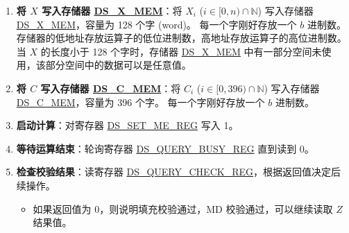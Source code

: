 \documentclass[main\_\_CN.tex]{subfiles}
\begin{document}
\begin{enumerate}
    \item {\bfseries 将 \begin{math}X\end{math} 写入存储器 \hyperref[DSXMEM]{DS\_X\_MEM}}：将 \begin{math}X_{i}\end{math}
        (\begin{math}i \in [0,n) \cap \mathbb{N}\end{math})
        写入存储器 \hyperref[DSXMEM]{DS\_X\_MEM}，容量为 128 个字 (word)。
        每一个字刚好存放一个 \begin{math}b\end{math} 进制数。存储器的低地址存放运算子的低位进制数，高地址存放运算子的高位进制数。当 \begin{math}X\end{math} 的长度小于 128 个字时，存储器 \hyperref[DSXMEM]{DS\_X\_MEM} 中有一部分空间未使用，该部分空间中的数据可以是任意值。

    \item {\bfseries 将 \begin{math}C\end{math} 写入存储器 \hyperref[DSCMEM]{DS\_C\_MEM}}：将
        \begin{math}C_{i}\end{math}
        (\begin{math}i \in [0,396) \cap \mathbb{N}\end{math})
        写入存储器 \hyperref[DSCMEM]{DS\_C\_MEM}，容量为 396 个字。
        每一个字刚好存放一个 \begin{math}b\end{math} 进制数。


    \item {\bfseries 启动计算}：对寄存器 \hyperref[regdesc:DSSETMEREG]{DS\_SET\_ME\_REG} 写入 1。

    \item {\bfseries 等待运算结束}：轮询寄存器 \hyperref[regdesc:DSQUERYBUSYREG]{DS\_QUERY\_BUSY\_REG} 直到读到 0。

    \item {\bfseries 检查校验结果}：读寄存器 \hyperref[regdesc:DSQUERYCHECKREG]{DS\_QUERY\_CHECK\_REG}，根据返回值决定后续操作。

    \begin{itemize}

        \item 如果返回值为 0，则说明填充校验通过，MD 校验通过，可以继续读取 \begin{math}Z\end{math} 结果值。


\end{itemize}
\end{enumerate}
\end{document}
